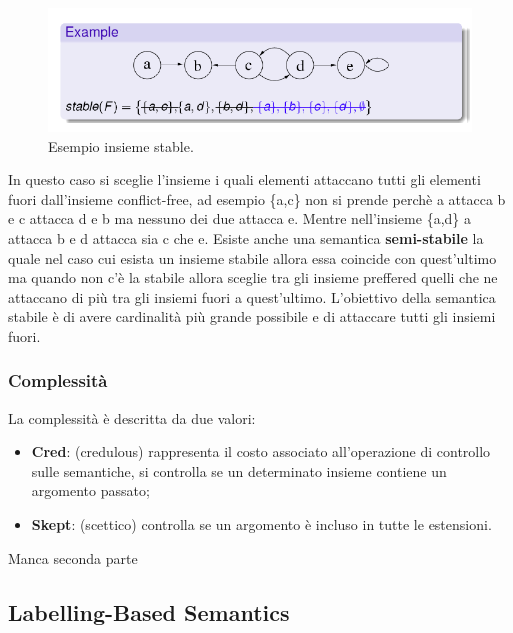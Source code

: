 \begin{figure}[H]
    \centering
    \includegraphics[width=13cm, keepaspectratio]{img/es_stable.png}
    \caption{Esempio insieme stable.}\label{fig:es_insieme_stable}
\end{figure}
In questo caso si sceglie l'insieme i quali elementi attaccano tutti gli elementi fuori dall'insieme conflict-free, ad esempio \{a,c\} non si prende perchè a attacca b e c attacca d e b ma nessuno dei due attacca e. Mentre nell'insieme \{a,d\} a attacca b e d attacca sia c che e. Esiste anche una semantica \textbf{semi-stabile} la quale nel caso cui esista un insieme stabile allora essa coincide con quest'ultimo ma quando non c'è la stabile allora sceglie tra gli insieme preffered quelli che ne attaccano di più tra gli insiemi fuori a quest'ultimo. L'obiettivo della semantica stabile è di avere  cardinalità più grande possibile e di attaccare tutti gli insiemi fuori.

\subsubsection{Complessità}
La complessità è descritta da due valori:
\begin{itemize}
    \item \textbf{Cred}: (credulous) rappresenta il costo associato all'operazione di controllo sulle semantiche, si controlla se un determinato insieme contiene un argomento passato;
    \item \textbf{Skept}: (scettico) controlla se un argomento è incluso in tutte le estensioni.
\end{itemize}
Manca seconda parte
\subsection{Labelling-Based Semantics}
